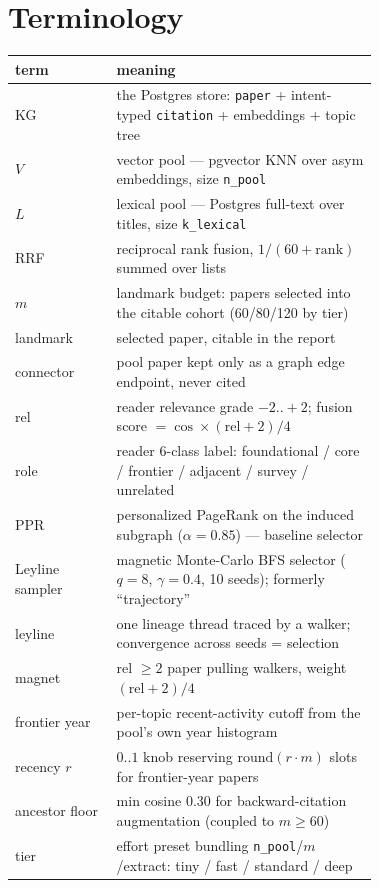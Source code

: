 \documentclass[10pt]{article}
\newenvironment{varbox}
  {\par\medskip\begin{lrbox}{\varboxsave}%
   \begin{minipage}{\dimexpr\linewidth-2\fboxsep\relax}\small\vspace{4pt}}
  {\vspace{4pt}\end{minipage}\end{lrbox}%
   \noindent\colorbox{boxbg}{\usebox{\varboxsave}}\par\medskip}
\begin{document}
\section*{Terminology}
\begin{varbox}
\begin{tabular}{@{}lp{0.72\linewidth}@{}}
\toprule
term & meaning \\
\midrule
KG & the Postgres store: \texttt{paper} + intent-typed \texttt{citation} + embeddings + topic tree \\
$V$ & vector pool --- pgvector KNN over asym embeddings, size \texttt{n\_pool} \\
$L$ & lexical pool --- Postgres full-text over titles, size \texttt{k\_lexical} \\
RRF & reciprocal rank fusion, $1/(60+\mathrm{rank})$ summed over lists \\
$m$ & landmark budget: papers selected into the citable cohort (60/80/120 by tier) \\
landmark & selected paper, citable in the report \\
connector & pool paper kept only as a graph edge endpoint, never cited \\
rel & reader relevance grade $-2..{+}2$; fusion score $= \cos \times (\mathrm{rel}+2)/4$ \\
role & reader 6-class label: foundational / core / frontier / adjacent / survey / unrelated \\
PPR & personalized PageRank on the induced subgraph ($\alpha=0.85$) --- baseline selector \\
Leyline sampler & magnetic Monte-Carlo BFS selector ($q=8$, $\gamma=0.4$, 10 seeds); formerly ``trajectory'' \\
leyline & one lineage thread traced by a walker; convergence across seeds = selection \\
magnet & rel $\geq 2$ paper pulling walkers, weight $(\mathrm{rel}+2)/4$ \\
frontier year & per-topic recent-activity cutoff from the pool's own year histogram \\
recency $r$ & $0..1$ knob reserving $\mathrm{round}(r \cdot m)$ slots for frontier-year papers \\
ancestor floor & min cosine 0.30 for backward-citation augmentation (coupled to $m \geq 60$) \\
tier & effort preset bundling \texttt{n\_pool}/$m$/extract: tiny / fast / standard / deep \\
\bottomrule
\end{tabular}
\end{varbox}
\end{document}
